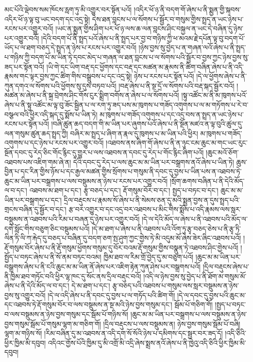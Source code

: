 མང་པོའི་ལྡེབས་སམ་ཁོངས་རླག་ཏུ་མི་འགྱུར་བར་སྟོན་པའོ། །འདིར་ཕོ་ཉ་ནི་བདག་གོ་ཞེས་པ་ནི་སྨྱན་གྱི་སྐབས་འདིར་ཕོ་ཉ་ལྟ་བུ་ཡང་བདག་དང་འདྲ་སྟེ། དེས་ཐན་བླངས་པ་ལ་སོགས་པ་སྦྱོར་བ་གསུམ་གྱིས་སྤྲད་ན་ཡང་ཉེས་པ་རངས་པར་འགྱུར་བའོ། །ཡང་ན་སྨྱན་གྱིས་ཤིག་པར་ཕོ་ཉ་ལས་ཆ་ལན་བླངས་ཤིང་བསྐྱལ་ན་ཡང་དེ་བཞིན་དུ་ཉེས་པར་འགྱུར་བའོ། །དེའི་བདག་པོ་ནི་སྤྲད་པའོ་ཞེས་པ་ནི་སྤྲད་པར་བྱ་བ་གཉིས་ཀྱི་ཕ་མའམ་རྗེ་དཔོན་ལྟ་བུ་བདག་པོ་ཡོད་པ་ལ་ཐག་བཅད་དེ་སྤྲད་ན་ཉེས་པ་རངས་པར་འགྱུར་བའོ། །ཉེས་བྱས་སུ་བྱེད་པ་ན་གཞན་ལའོ་ཞེས་པ་ནི་སྤྲད་པ་གཉིས་ཀྱི་བདག་པོ་མ་ཡིན་ཏེ་དབང་མེད་པ་གཞན་ལ་ཐན་བླངས་པ་ལ་སོགས་པའི་སྦྱོར་བ་བྱས་ཀྱང་ཉེས་བྱས་སུ་ཟད་པར་སྟོན་བའོ། །ཡི་གེ་དང་ཡིག་བརྡ་དང་ཕྱོགས་དང་བརྡ་དང་མཚན་མ་རྣམས་ནི་ཚིག་བཞིན་ཞེས་པ་ནི་འདི་རྣམས་གང་ལྟར་བྱས་ཀྱང་ཚིག་གིས་བསྒྲུབས་པ་དང་འདྲ་སྟེ། ཉེས་པ་རངས་པར་སྟོན་པའོ། །དེ་ལ་ཕྱོགས་ཞེས་པ་ནི་ཀུན་དགའ་ལ་སོགས་པའི་ཕྱོགས་སུ་དུས་བཏབ་པའོ། །བརྡ་ཞེས་པ་ནི་སྔ་དྲོ་ལ་སོགས་པའི་བརྡ་སྐད་སྦྱོར་བའོ། །མཚན་མ་ཞེས་པ་ནི་སྐྲ་བྲེགས་ཤིང་གོས་ངུར་སྨྲིག་བགོས་ན་ཞེས་པ་ལ་སོགས་པའོ། །སྟུ་འཚོང་མ་ནི་མ་ཁུགས་པའོ་ཞེས་པ་ནི་སྟུ་འཚོང་མ་ལྟ་བུ་ཟོང་སྦྱིན་པ་ལ་རག་ཏུ་ཟད་པས་མ་ཁུགས་པ་གཟོད་འགུགས་པ་ལ་མ་གཏོགས་པ་རེ་བ་བསྩལ་བའི་ཕྱིར་འདི་སྐད་དུ་སྨོས་པ་ཡིན་ཏེ། མ་ཁུགས་པ་གཟོད་འགུགས་པ་དང་འདྲ་བས་ན་སྤྲད་ན་ཡང་ཉེས་པ་རངས་པར་སྟོན་པའོ། །བཞི་ཚུན་ཆད་བདག་གི་མ་ཡིན་པར་ཞུགས་པའོ་ཞེས་པ་ནི་སྔོན་མཛའ་ན་ལྟ་བུའི་ཚུལ་དུ་ལན་གསུམ་ཚུན་ཆད་སྤྲད་ཀྱི། བཞིར་མ་སྤྲད་པ་ཞིག་ན་རྣལ་དུ་ཁུགས་པ་མ་ཡིན་པའི་ཕྱིར། མ་ཁུགས་པ་གཟོད་འགུགས་པ་དང་ཉེས་པ་རངས་པར་འགྱུར་བའོ། །འཐབས་ནས་ཞིག་གོ་ཞེས་པ་ནི་ན་ཉུང་ངམ་ཆུང་མ་གང་ཡང་རུང་སྔོན་དབང་དུ་རེད་ཅིང་གོང་རྙིང་དུ་གྱུར་པ་ལས་འཐབས་ན་དབང་དུ་རེད་པ་གོང་རྙིང་ཞིག་པའོ། །ཆུང་མའོ་ཅོག་འཐབས་པས་འཇིག་གམ་ཞེ་ན། དེའི་དབང་དུ་རེད་པ་ལས་ཆུང་མ་མ་ཡིན་པར་བསྒྲགས་ནའོ་ཞེས་པ་ཡིན་ཏེ། ཆུས་བྱིན་པ་དང་རིན་གྱིས་ཉོས་པ་དང་རྒྱལ་མཚན་གྱིས་སྲོགས་པ་གསུམ་ནི་དབང་དུ་བྱས་པ་ཡིན་པས་ན་འཐབས་ཏེ་ཆུང་མ་ཡིན་པར་བསྒྲགས་པ་ལས་བསྡུམས་ན་ཉེས་པ་རངས་པར་འགྱུར་བའོ། །སྲོག་ཆགས་བཞིན་པ་ནི་དེའི་མོད་ལ་བ་དང་། འཐབས་མ་ཐག་པ་དང་། རྩྭ་བཅད་པ་དང་། རྡོ་གསུམ་བོར་བ་དང་། སྤྱད་པ་བཏང་བ་དང་། ཆུང་མ་མ་ཡིན་པར་བསྒྲགས་པ་དང་། དྲིལ་བརྡུངས་པ་རྣམས་སོ་ཞེས་པ་ནི་སེམས་ཅན་དུ་མའི་སྨྱན་བྱས་ན་དུས་སྤྲད་པའི་གྲངས་བཞིན་དུ་སྦྱོར་བ་དང་། རྩ་བར་འགྱུར་བ་དང་འདྲ་བར་འཐབས་པ་མིང་གིས་སྨོས་པ་འདི་རྣམས་ལས་སླར་བསྡུམས་ན་འཐབས་པའི་རིམ་པ་བཞན་དུ་ཉེས་པར་འགྱུར་བའོ། །དེ་ལ་དེའི་མོད་ལ་ཞེས་པ་ནི་འཐབས་པའི་མོད་ལ་དགེ་སློང་གིས་བཅུག་ཅིང་བསྡུམས་པའོ། །དེ་མ་ཐག་པ་ཞེས་པ་ནི་འཐབས་པའི་འོག་ཏུ་རྩྭ་བཅད་ཅེས་པ་ནི་རྩྭ་ཏི་ལིན་ཏི་ལི་ཀ་རྐེད་དུ་བཅད་པ་བཞིན་དུ་བདག་ཅག་སྤ་ཤུག་ཀྱང་གྱེས་ཏེ་མི་འདུམ་མོ་ཞེས་ཟེར་ཞིང་འཐབས་པའོ། །རྡོ་གསུམ་བོར་ཞེས་པ་ནི་རྡོ་གསུམ་ཕྱོགས་གསུམ་དུ་བོར་བའམ་རྡོ་གསུམ་གྱིས་བསྣུན་ཏེ་འཐབས་ཤིང་གྱེས་པའོ། །སྤྱོད་པ་བཏང་ཞེས་པ་ནི་སོ་ནམ་བཏང་བའམ། ཁྱིམ་ཐབ་ལ་རིམ་གྲོ་བྱེད་དུ་མ་བཅུག་པའོ། །ཆུང་མ་མ་ཡིན་པར་བསྒྲགས་ཞེས་པ་ནི་ངའི་ཆུང་མ་མ་ཡིན་ནོ་ཞེས་པར་འཇིག་རྟེན་ཀུན་ཤེས་པར་བསྒྲགས་པའོ། །དྲིལ་བརྡུངས་ཞེས་པ་ནི་ཁྱིམ་ཐབ་གཏོང་བའི་ཕྱིར་ལྷ་ཁང་དུ་སོང་ནས་དྲིལ་བརྡུང་བའོ། །འདི་ལ་ཉེས་བྱས་སུ་བྱེད་པ་ནི་ཐོག་མ་གསུམ་མོ་ཞེས་པ་ནི་དེའི་མོད་ལ་བ་དང་། དེ་མ་ཐག་པ་དང་། རྩྭ་བཅད་པའི་འཐབས་པ་གསུམ་ལས་སླར་བསྡུམས་ན་ཉེས་བྱས་སུ་འགྱུར་བའོ། །དེ་ལ་འདི་ཞེས་པ་ནི་དབང་དུ་བྱས་པ་ལ་གཏོད་པའི་ཚིག་གོ། །དེ་ལ་དབང་དུ་བྱས་པའི་ཆུང་མ་དང་འཐབས་ཏེ་རྡོ་གསུམ་བོར་བ་ལས་བསྡུམས་ན་སྔ་མའི་ཉེས་བྱས་གསུམ་དང་། སྦོམ་པོ་གཅིག་གོ། །སྤྱད་པ་བཏང་བ་ལས་བསྡུམས་ན་ཉེས་བྱས་གསུམ་དང་སྦོམ་པོ་གཉིས་སོ། །ཆུང་མ་མ་ཡིན་པར་བསྒྲགས་པ་ལས་བསྡུམས་ན་ཉེས་བྱས་གསུམ་སྦོམ་པོ་གསུམ་ལྷག་མ་གཅིག་གོ། །དྲིལ་བརྡུངས་པ་ལས་བསྡུམས་ན། ཉེས་བྱས་གསུམ་སྦོམ་པོ་བཞི། ལྷག་མ་གཉིས་སོ། །རིམ་བཞིན་དུ་མ་འཐབས་ན་འདི་དག་སོ་སོའི་ཉེས་པ་དམིགས་དང་སྦྱར་བར་ཟད་དོ། །འདི་ཅིའི་ཕྱིར་ཁྱིམ་མི་དབུབ། འདིའང་གྱོས་པོའི་ཁྱིམ་དུ་མི་འགྲོ་མི་འདྲི་ཞེས་སྨྲས་ནའོ་ཞེས་པ་ནི་ཁྱེའུ་འདི་ཅིའི་ཕྱིར་ཁྱིམ་མི་དབུབ། 